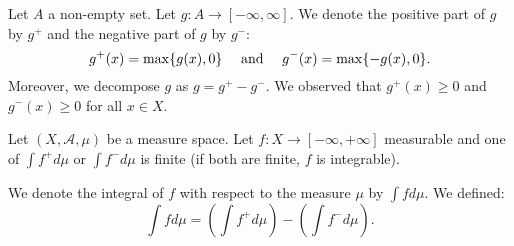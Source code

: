 
Let $A$ a non-empty set.
Let $g: A \to [-\infty, \infty]$.
We denote the positive part
of $g$ by $g^+$ and the negative
part of $g$ by $g^-$:
\[
  g^+(x) = \max\{g(x), 0\} \quad \text{ and } \quad g^-(x) = \max\{-g(x), 0\}.
\]
Moreover, we decompose
$g$
as
$g = g^+ - g^-$.
We observed that
$g^+(x) \geq 0$ and
$g^-(x) \geq 0$
for all $x \in X$.

Let $(X, \mathcal{A}, \mu)$
be a measure space.
Let $f: X \to [-\infty, +\infty]$
measurable and
one of
$\int f^+ d \mu$ or
$\int f^- d \mu$
is finite
(if both are finite,
$f$ is integrable).

We denote the integral
of $f$ with respect to the
measure $\mu$ by
$\int f d \mu$.
We defined:
\[
  \int f d\mu = \left(\int f^+ d\mu\right) - \left(\int f^- d\mu\right).
\]
\strats
